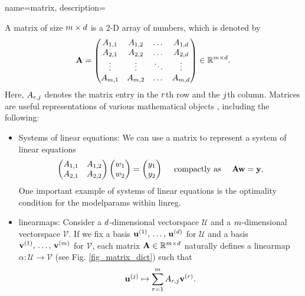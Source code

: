 {name={matrix},
	description={A matrix of size $m \times d$ is a 2-D array of numbers, 
 		which is denoted by 
		$$
  		{\bf A} = \begin{pmatrix}
   		A_{1,1} & A_{1,2} & \dots  & A_{1,d} \\
		A_{2,1} & A_{2,2} & \dots  & A_{2,d} \\
		\vdots  & \vdots  & \ddots & \vdots \\
		A_{m,1} & A_{m,2} & \dots  & A_{m,d}
		\end{pmatrix} \in \mathbb{R}^{m \times d}.
		$$
		Here, $A_{r,j}$ denotes the matrix entry in the $r$th row and the 
		$j$th column. Matrices are useful representations of various mathematical objects \cite{StrangLinAlg2016},
		including the following:
		\begin{itemize}
			\item Systems of linear equations: We can use a matrix to represent a system of linear equations 
			$$ \begin{pmatrix}
			A_{1,1} & A_{1,2} \\
			A_{2,1} & A_{2,2}
			\end{pmatrix}
			\begin{pmatrix}
				w_1 \\
				w_2
			\end{pmatrix}
			=\begin{pmatrix}
				y_1 \\
				y_2
			\end{pmatrix}
			\quad \text{ compactly as } \quad {\bf A} {\bf w} = {\bf y}.
			$$
    			One important example of systems of linear equations is the optimality condition for the 
    			\gls{modelparams} within \gls{linreg}. 
			\item \Glspl{linearmap}:
			Consider a $d$-dimensional \gls{vectorspace} $\mathcal{U}$ and a $m$-dimensional \gls{vectorspace} $\mathcal{V}$. 
			If we fix a basis $\mathbf{u}^{(1)},\,\ldots,\,\mathbf{u}^{(d)}$ for $\mathcal{U}$ and a basis $\mathbf{v}^{(1)},\,\ldots,\,\mathbf{v}^{(m)}$ 
			for $\mathcal{V}$, each matrix ${\bf A} \in \mathbb{R}^{m \times d}$ naturally defines a 
			\gls{linearmap} $\alpha: \mathcal{U} \rightarrow \mathcal{V}$ (see Fig. \ref{fig_matrix_dict}) such that
   			$${\bf u}^{(j)} \mapsto \sum_{r=1}^{m} A_{r,j} {\bf v}^{(r)}.$$

\end{itemize}}}
